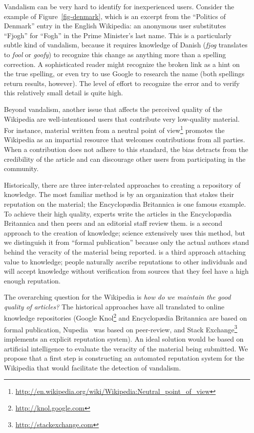 Vandalism can be very hard to identify for inexperienced users.
Consider the example of Figure~\ref{fig-denmark},
which is an excerpt from the ``Politics of Denmark''
entry in the English Wikipedia: an anonymous user substitutes
``Fjogh'' for ``Fogh'' in the Prime Minister's last name.
This is a particularly subtle kind of vandalism,
because it requires knowledge of Danish
(\textit{fjog} translates to \textit{fool} or \textit{goofy})
to recognize this change as anything more than a spelling correction.
A sophisticated reader might recognize the broken link
as a hint on the true spelling, or even try to use Google
to research the name (both spellings return results, however).
The level of effort to recognize the error and to
verify this relatively small detail is quite high.

Beyond vandalism, another issue that affects the perceived
quality of the Wikipedia are well-intentioned users that contribute
very low-quality material.
For instance, material written from a
neutral point of view\footnote{\url{http://en.wikipedia.org/wiki/Wikipedia:Neutral_point_of_view}}
promotes the Wikipedia as an impartial resource that welcomes contributions
from all parties.
When a contribution does not adhere to this standard, the bias
detracts from the credibility of the article and can discourage
other users from participating in the community.

Historically, there are three inter-related approaches to
creating a repository of knowledge.
The most familiar method is  by an organization
that stakes their reputation on the material;
the Encyclop{\ae}dia Britannica is one famous example.
To achieve their high quality, experts write the articles in the
Encyclop{\ae}dia Britannica
and then peers and an editorial staff review them.
 is a second approach to the creation of
knowledge; science extensively uses this method,
but we distinguish it from ``formal publication'' because
only the actual authors stand behind the veracity of the
material being reported.
 is a third approach attaching value
to knowledge; people naturally ascribe reputations to other
individuals and will accept knowledge without verification from
sources that they feel have a high enough reputation.

The overarching question for the Wikipedia is
\textit{how do we maintain the good quality of articles?}
The historical approaches have all translated to online
knowledge repositories (\eg Google Knol\footnote{\url{http://knol.google.com}}
and Encyclop{\ae}dia Britannica
are based on formal publication,
Nupedia~\cite{wiki:Nupedia}
was based on peer-review,
and Stack Exchange\footnote{\url{http://stackexchange.com}}
implements an explicit reputation system).
An ideal solution would be based on artificial intelligence to
evaluate the veracity of the material being submitted.
We propose that a first step is constructing an automated reputation system
for the Wikipedia that would facilitate the
detection of vandalism.

